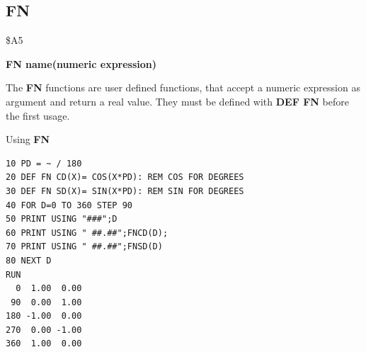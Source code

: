 \subsection{FN}
\begin{description}[leftmargin=2cm,style=nextline]
\item [Token:] \$A5
\item [Format:] {\bf FN name(numeric expression)}
\item [Usage:] The {\bf FN} functions are user defined
               functions, that accept a numeric expression as
               argument and return a real value.
               They must be defined with {\bf DEF FN} before
               the first usage.

\item [Example:] Using {\bf FN}
\begin{tcolorbox}[colback=black,coltext=white]
\verbatimfont{\codefont}
\begin{verbatim}
10 PD = ~ / 180
20 DEF FN CD(X)= COS(X*PD): REM COS FOR DEGREES
30 DEF FN SD(X)= SIN(X*PD): REM SIN FOR DEGREES
40 FOR D=0 TO 360 STEP 90
50 PRINT USING "###";D
60 PRINT USING " ##.##";FNCD(D);
70 PRINT USING " ##.##";FNSD(D)
80 NEXT D
RUN
  0  1.00  0.00
 90  0.00  1.00
180 -1.00  0.00
270  0.00 -1.00
360  1.00  0.00
\end{verbatim}
\end{tcolorbox}
\end{description}


\newpage
